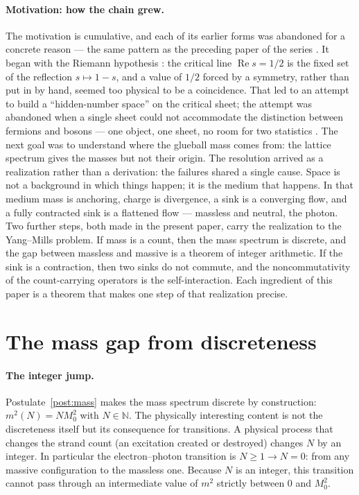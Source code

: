 \documentclass[aps,prd,preprint,superscriptaddress,amsmath,amssymb]{revtex4-2}
\begin{document}
\paragraph{Motivation: how the chain grew.}
The motivation is cumulative, and each of its earlier forms was
abandoned for a concrete reason --- the same pattern as the preceding
paper of the series \cite{ProjectionPhysics,HibsPhysics}.  It began
with the Riemann hypothesis \cite{riemann1859ueber}: the critical
line $\operatorname{Re}s=1/2$ is the fixed set of the reflection
$s\mapsto 1-s$, and a value of $1/2$ forced by a symmetry, rather
than put in by hand, seemed too physical to be a coincidence.  That
led to an attempt to build a ``hidden-number space'' on the critical
sheet; the attempt was abandoned when a single sheet could not
accommodate the distinction between fermions and bosons --- one
object, one sheet, no room for two statistics \cite{RiemannHIBS}.
The next goal was to understand where the glueball mass comes from:
the lattice spectrum \cite{morningstar1999glueball,chen2006glueball}
gives the masses but not their origin.  The resolution arrived as a
realization rather than a derivation: the failures shared a single
cause.  Space is not a background in which things happen; it is the
medium that happens.  In that medium mass is anchoring, charge is
divergence, a sink is a converging flow, and a fully contracted sink
is a flattened flow --- massless and neutral, the photon.  Two
further steps, both made in the present paper, carry the realization
to the Yang--Mills problem.  If mass is a count, then the mass
spectrum is discrete, and the gap between massless and massive is a
theorem of integer arithmetic.  If the sink is a contraction, then
two sinks do not commute, and the noncommutativity of the
count-carrying operators is the self-interaction.  Each ingredient of
this paper is a theorem that makes one step of that realization
precise.

\section{The mass gap from discreteness}
\label{sec:massgap}

\paragraph{The integer jump.}
Postulate~\ref{post:mass} makes the mass spectrum discrete by
construction: $m^2(N)=N M_0^2$ with $N\in\mathbb{N}$.  The
physically interesting content is not the discreteness itself but
its consequence for transitions.  A physical process that changes
the strand count (an excitation created or destroyed) changes $N$
by an integer.  In particular the electron--photon transition is
$N\ge1\to N=0$: from any massive configuration to the massless one.
Because $N$ is an integer, this transition cannot pass through an
intermediate value of $m^2$ strictly between $0$ and $M_0^2$.
\end{document}
